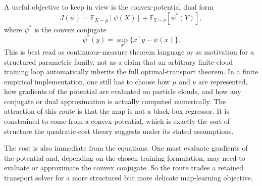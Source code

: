 A useful objective to keep in view is the convex-potential dual form
\begin{equation}
\label{eq:bf-neural-ot-direct-dual-objective}
  J(\psi)
  =
  \mathbb E_{X\sim\mu}[\psi(X)]
  +
  \mathbb E_{Y\sim\nu}[\psi^*(Y)],
\end{equation}
where \(\psi^*\) is the convex conjugate
\begin{equation}
\label{eq:bf-neural-ot-direct-conjugate}
  \psi^*(y)=\sup_x\{x^\top y-\psi(x)\}.
\end{equation}
This is best read as continuous-measure theorem language or as motivation for a
structured parametric family, not as a claim that an arbitrary finite-cloud
training loop automatically inherits the full optimal-transport theorem.  In a
finite empirical implementation, one still has to choose how \(\mu\) and \(\nu\)
are represented, how gradients of the potential are evaluated on particle clouds,
and how any conjugate or dual approximation is actually computed numerically.
The attraction of this route is that the map is not a black-box regressor.  It is
constrained to come from a convex potential, which is exactly the sort of
structure the quadratic-cost theory suggests under its stated assumptions.

The cost is also immediate from the equations.  One must evaluate gradients of the
potential and, depending on the chosen training formulation, may need to evaluate
or approximate the convex conjugate.  So the route trades a retained transport
solver for a more structured but more delicate map-learning objective.

